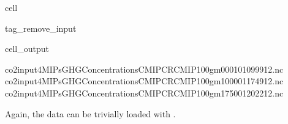 \documentclass[letterpaper,10pt,english]{jupyterBook}
\begin{document}
\begin{sphinxuseclass}{cell}
\begin{sphinxuseclass}{tag_remove_input}\begin{sphinxVerbatimOutput}

\begin{sphinxuseclass}{cell_output}
\begin{sphinxVerbatim}[commandchars=\\\{\}]
\PYGZhy{} co2\PYGZus{}input4MIPs\PYGZus{}GHGConcentrations\PYGZus{}CMIP\PYGZus{}CR\PYGZhy{}CMIP\PYGZhy{}1\PYGZhy{}0\PYGZhy{}0\PYGZus{}gm\PYGZus{}000101\PYGZhy{}099912.nc
\PYGZhy{} co2\PYGZus{}input4MIPs\PYGZus{}GHGConcentrations\PYGZus{}CMIP\PYGZus{}CR\PYGZhy{}CMIP\PYGZhy{}1\PYGZhy{}0\PYGZhy{}0\PYGZus{}gm\PYGZus{}100001\PYGZhy{}174912.nc
\PYGZhy{} co2\PYGZus{}input4MIPs\PYGZus{}GHGConcentrations\PYGZus{}CMIP\PYGZus{}CR\PYGZhy{}CMIP\PYGZhy{}1\PYGZhy{}0\PYGZhy{}0\PYGZus{}gm\PYGZus{}175001\PYGZhy{}202212.nc
\end{sphinxVerbatim}

\end{sphinxuseclass}\end{sphinxVerbatimOutput}

\end{sphinxuseclass}
\end{sphinxuseclass}
\sphinxAtStartPar
Again, the data can be trivially loaded with .
\end{document}
